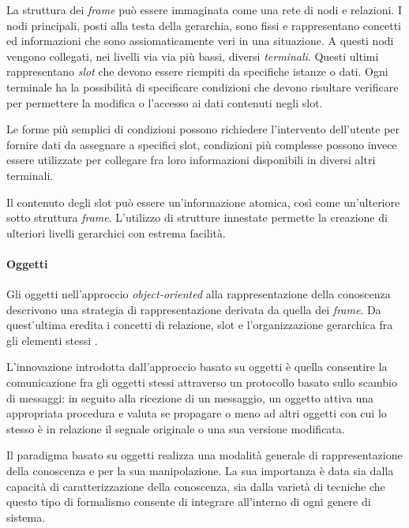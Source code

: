 La struttura dei \emph{frame} può essere immaginata come una rete di nodi e relazioni. I nodi principali, posti alla testa della gerarchia, sono fissi e rappresentano concetti ed informazioni che sono assiomaticamente veri in una situazione. A questi nodi vengono collegati, nei livelli via via più bassi, diversi \emph{terminali}. Questi ultimi rappresentano \emph{slot} che devono essere riempiti da specifiche istanze o dati. Ogni terminale ha la possibilità di specificare condizioni che devono risultare verificare per permettere la modifica o l'accesso ai dati contenuti negli slot. 

Le forme più semplici di condizioni possono richiedere l'intervento dell'utente per fornire dati da assegnare a specifici slot, condizioni più complesse possono invece essere utilizzate per collegare fra loro informazioni disponibili in diversi altri terminali. 

Il contenuto degli slot può essere un'informazione atomica, così come un'ulteriore sotto struttura \emph{frame}. L'utilizzo di strutture innestate permette la creazione di ulteriori livelli gerarchici con estrema facilità. \cite{minsky1974} 

\paragraph{Oggetti}
Gli oggetti nell'approccio \emph{object-oriented} alla rappresentazione della conoscenza descrivono una strategia di rappresentazione derivata da quella dei \emph{frame}. Da quest'ultima eredita i concetti di relazione, slot e l'organizzazione gerarchica fra gli elementi stessi \cite{holsapple1994object}.

L'innovazione introdotta dall'approccio basato su oggetti è quella consentire la comunicazione fra gli oggetti stessi attraverso un protocollo basato sullo scambio di messaggi: in seguito alla ricezione di un messaggio, un oggetto attiva una appropriata procedura e valuta se propagare o meno ad altri oggetti con cui lo stesso è in relazione il segnale originale o una sua versione modificata. \cite{development1993}

Il paradigma basato su oggetti realizza una modalità generale di rappresentazione della conoscenza e per la sua manipolazione. La sua importanza è data sia dalla capacità di caratterizzazione della conoscenza, sia dalla varietà di tecniche che questo tipo di formalismo consente di integrare all'interno di ogni genere di sistema. \cite{holsapple1994object}

